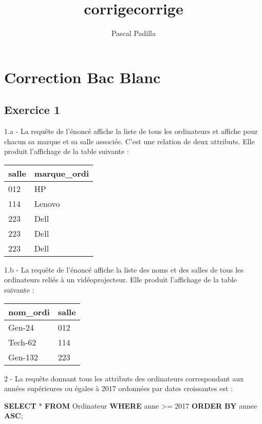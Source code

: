 \documentclass[a4paper,17pt]{extarticle}
\title{corrige}
\newenvironment{Shaded}{}{}
\newcommand{\KeywordTok}[1]{\textcolor[rgb]{0.00,0.44,0.13}{\textbf{{#1}}}}
\newcommand{\DecValTok}[1]{\textcolor[rgb]{0.25,0.63,0.44}{{#1}}}
\newcommand{\NormalTok}[1]{{#1}}
\newcommand{\OperatorTok}[1]{\textcolor[rgb]{0.40,0.40,0.40}{{#1}}}
\begin{document}
    
    \author{Pascal Padilla}\title{corrige}

    
    

    
    \hypertarget{correction-bac-blanc}{%
\section{Correction Bac Blanc}\label{correction-bac-blanc}}

    \hypertarget{exercice-1}{%
\subsection{Exercice 1}\label{exercice-1}}

    1.a - La requête de l'énoncé affiche la liste de tous les ordinateurs et
affiche pour chacun sa marque et sa salle associée. C'est une relation
de deux attributs. Elle produit l'affichage de la table suivante :

\begin{longtable}[]{@{}ll@{}}
\toprule
salle & marque\_ordi\tabularnewline
\midrule
\endhead
012 & HP\tabularnewline
114 & Lenovo\tabularnewline
223 & Dell\tabularnewline
223 & Dell\tabularnewline
223 & Dell\tabularnewline
\bottomrule
\end{longtable}

    1.b - La requête de l'énoncé affiche la liste des noms et des salles de
tous les ordinateurs reliés à un vidéoprojecteur. Elle produit
l'affichage de la table suivante :

\begin{longtable}[]{@{}ll@{}}
\toprule
nom\_ordi & salle\tabularnewline
\midrule
\endhead
Gen-24 & 012\tabularnewline
Tech-62 & 114\tabularnewline
Gen-132 & 223\tabularnewline
\bottomrule
\end{longtable}

    2 - La requête donnant tous les attributs des ordinateurs correspondant
aux années supérieures ou égales à 2017 ordonnées par dates croissantes
est :

\begin{Shaded}
\begin{Highlighting}[]
\KeywordTok{SELECT} \OperatorTok{*} \KeywordTok{FROM}\NormalTok{ Ordinateur}
\KeywordTok{WHERE}\NormalTok{ anne }\OperatorTok{\textgreater{}=} \DecValTok{2017}
\KeywordTok{ORDER} \KeywordTok{BY}\NormalTok{ annee }\KeywordTok{ASC}\NormalTok{;}
\end{Highlighting}
\end{Shaded}
\end{document}
